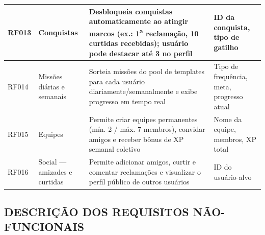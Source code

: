 \begin{longtable}{|p{1.5cm}|p{3cm}|p{6cm}|p{3.5cm}|}
  \hline
  RF013 & Conquistas & Desbloqueia conquistas automaticamente ao atingir marcos (ex.: 1\textsuperscript{a} reclamação, 10 curtidas recebidas); usuário pode destacar até 3 no perfil & ID da conquista, tipo de gatilho \\
  \hline
  RF014 & Missões diárias e semanais & Sorteia missões do pool de templates para cada usuário diariamente/semanalmente e exibe progresso em tempo real & Tipo de frequência, meta, progresso atual \\
  \hline
  RF015 & Equipes & Permite criar equipes permanentes (mín. 2 / máx. 7 membros), convidar amigos e receber bônus de XP semanal coletivo & Nome da equipe, membros, XP total \\
  \hline
  RF016 & Social — amizades e curtidas & Permite adicionar amigos, curtir e comentar reclamações e visualizar o perfil público de outros usuários & ID do usuário-alvo \\
  \hline
\end{longtable}

\subsection{DESCRIÇÃO DOS REQUISITOS NÃO-FUNCIONAIS}

